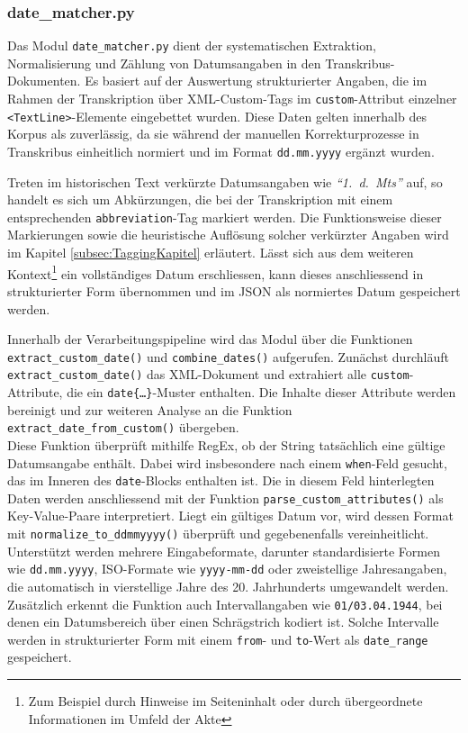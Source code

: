 \documentclass[12pt, a4paper, ngerman, bidi=default]{article}
\begin{document}
\subsubsection*{date\_matcher.py}\label{subsection:date_matcher}
Das Modul \texttt{date\_matcher.py} dient der systematischen Extraktion, Normalisierung und 
Zählung von Datumsangaben in den Transkribus-Dokumenten. Es basiert auf der 
Auswertung strukturierter Angaben, die im Rahmen der Transkription über XML-Custom-Tags im 
\texttt{custom}-Attribut einzelner \texttt{<TextLine>}-Elemente eingebettet wurden. Diese 
Daten gelten innerhalb des Korpus als zuverlässig, da sie während der manuellen Korrekturprozesse
in Transkribus einheitlich normiert und im Format \texttt{dd.mm.yyyy} ergänzt wurden.


Treten im historischen Text verkürzte Datumsangaben wie \textit{\enquote{1.~d.~Mts}} auf, so handelt
es sich um Abkürzungen, die bei der Transkription mit einem entsprechenden \texttt{abbreviation}-Tag
markiert werden. Die Funktionsweise dieser Markierungen sowie die heuristische Auflösung solcher 
verkürzter Angaben wird im Kapitel \ref{subsec:TaggingKapitel} erläutert. Lässt sich aus dem weiteren 
Kontext\footnote{Zum Beispiel durch Hinweise im Seiteninhalt oder durch übergeordnete Informationen im Umfeld der Akte} 
ein vollständiges Datum erschliessen, kann dieses anschliessend in strukturierter Form übernommen und im JSON als 
normiertes Datum gespeichert werden.

Innerhalb der Verarbeitungspipeline wird das Modul über die Funktionen \texttt{extract\_custom\_date()} und 
\texttt{combine\_dates()} aufgerufen. Zunächst durchläuft \texttt{extract\_custom\_date()} das XML-Dokument 
und extrahiert alle \texttt{custom}-Attribute, die ein \texttt{date\{…\}}-Muster enthalten. Die Inhalte dieser 
Attribute werden bereinigt und zur weiteren Analyse an die Funktion \texttt{extract\_date\_from\_custom()} übergeben.\\
Diese Funktion überprüft mithilfe RegEx, ob der String tatsächlich eine gültige Datumsangabe enthält. 
Dabei wird insbesondere nach einem \texttt{when}-Feld gesucht, das im Inneren des \texttt{date}-Blocks enthalten ist. 
Die in diesem Feld hinterlegten Daten werden anschliessend mit der Funktion \texttt{parse\_custom\_attributes()} als 
Key-Value-Paare interpretiert. Liegt ein gültiges Datum vor, wird dessen Format mit \texttt{normalize\_to\_ddmmyyyy()} 
überprüft und gegebenenfalls vereinheitlicht.
\\
Unterstützt werden mehrere Eingabeformate, darunter standardisierte Formen wie \texttt{dd.mm.yyyy}, ISO-Formate 
wie \texttt{yyyy-mm-dd} oder zweistellige Jahresangaben, die automatisch in vierstellige Jahre des 20.
Jahrhunderts umgewandelt werden. Zusätzlich erkennt die Funktion auch Intervallangaben wie \texttt{01/03.04.1944}, 
bei denen ein Datumsbereich über einen Schrägstrich kodiert ist. Solche Intervalle werden in strukturierter Form mit 
einem \texttt{from}- und \texttt{to}-Wert als \texttt{date\_range} gespeichert.
\end{document}
